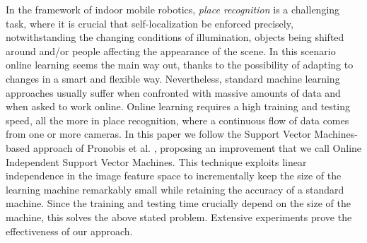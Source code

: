 In the framework of indoor mobile robotics, \emph{place recognition}
is a challenging task, where it is crucial that self-localization be
enforced precisely, notwithstanding the changing conditions of
illumination, objects being shifted around and/or people affecting the
appearance of the scene. In this scenario online learning seems the
main way out, thanks to the possibility of adapting to changes in a
smart and flexible way. Nevertheless, standard machine learning
approaches usually suffer when confronted with massive amounts of data
and when asked to work online. Online learning requires a high
training and testing speed, all the more in place recognition, where a
continuous flow of data comes from one or more cameras. In this paper
we follow the Support Vector Machines-based approach of
Pronobis et al. \cite{pronobis:iros06}, proposing an improvement that
we call Online Independent Support Vector Machines. This technique
exploits linear independence in the image feature space to
incrementally keep the size of the learning machine remarkably small
while retaining the accuracy of a standard machine. Since the training
and testing time crucially depend on the size of the machine, this
solves the above stated problem. Extensive experiments prove the
effectiveness of our approach.
